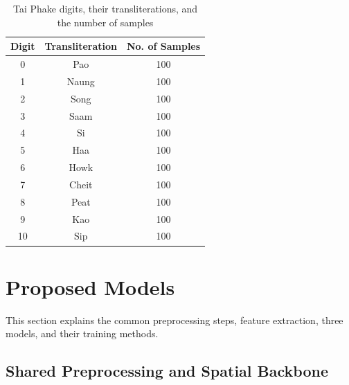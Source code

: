\documentclass[journal]{IEEEtran}
\begin{document}
\begin{table}[!t]
    \centering
    \caption{Tai Phake digits, their transliterations, and the number of samples}
    \label{taiphake_digits}
    \vspace{2pt}
    \begin{tabular}{c|c|c}
        \textbf{Digit} & \textbf{Transliteration} & \textbf{No. of Samples} \\
        \hline
        0              & Pao                      & 100                     \\
        1              & Naung                    & 100                     \\
        2              & Song                     & 100                     \\
        3              & Saam                     & 100                     \\
        4              & Si                       & 100                     \\
        5              & Haa                      & 100                     \\
        6              & Howk                     & 100                     \\
        7              & Cheit                    & 100                     \\
        8              & Peat                     & 100                     \\
        9              & Kao                      & 100                     \\
        10             & Sip                      & 100                     \\
    \end{tabular}
\end{table}

\section{Proposed Models}
This section explains the common preprocessing steps, feature extraction, three models, and their training methods.

\subsection{Shared Preprocessing and Spatial Backbone}
\end{document}
